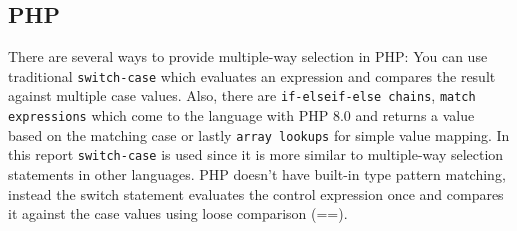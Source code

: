 \documentclass{article}
\begin{document}
\subsection{PHP}
There are several ways to provide multiple-way selection in PHP: You can use traditional \texttt{switch-case} which evaluates an expression and compares the result against multiple case values.
Also, there are \texttt{if-elseif-else chains}, \texttt{match expressions} which come to the language with PHP 8.0 and returns a value based on the matching case or lastly \texttt{array lookups} for simple value mapping. 
In this report \texttt{switch-case} is used since it is more similar to multiple-way selection statements in other languages.
PHP doesn't have built-in type pattern matching, instead the switch statement evaluates the control expression once and compares it against the case values using loose comparison (==). 
\end{document}
